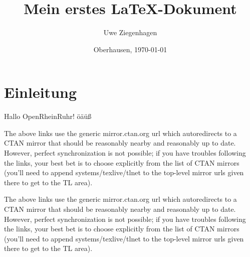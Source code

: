 \documentclass[ngerman]{scrartcl}
\author{Uwe Ziegenhagen}
\title{Mein erstes \LaTeX-Dokument}
\date{Oberhausen, \today}
\begin{document}
\maketitle

\tableofcontents

\section{Einleitung}

Hallo OpenRheinRuhr! öäüß

The above links use the generic mirror.ctan.org url which autoredirects to a CTAN mirror that should be reasonably nearby and reasonably up to date. However, perfect synchronization is not possible; if you have troubles following the links, your best bet is to choose explicitly from the list of CTAN mirrors (you'll need to append systems/texlive/tlnet to the top-level mirror urls given there to get to the TL area). 

The above links use the generic mirror.ctan.org url which autoredirects to a CTAN mirror that should be reasonably nearby and reasonably up to date. However, perfect synchronization is not possible; if you have troubles following the links, your best bet is to choose explicitly from the list of CTAN mirrors (you'll need to append systems/texlive/tlnet to the top-level mirror urls given there to get to the TL area). 
\end{document}
